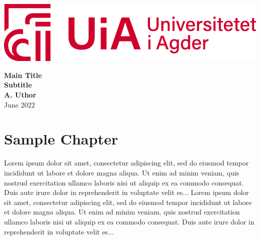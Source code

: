 \documentclass[12pt]{report}
\begin{document}
	\begin{titlepage}
		\centering    
		\vfill
		\includegraphics[width=0.5\paperwidth]{logo.png} %
		\vfill
		\vfill
		
		{\bfseries\Large
			Main Title\\
			Subtitle\\
			\vskip4cm
			A. Uthor\\
		}
		June 2022 \\
		\vfill
	\end{titlepage}
	\newpage
		\tableofcontents
	\newpage
		\listoffigures
	\newpage
	
	\chapter{Sample Chapter}
		\thispagestyle{empty}
	
		Lorem ipsum dolor sit amet, consectetur\autocite{Morales2020} adipiscing elit, sed do 
		eiusmod tempor incididunt ut labore et dolore magna aliqua. Ut enim 
		ad minim veniam, quis nostrud exercitation ullamco laboris nisi 
		ut aliquip ex ea commodo consequat. Duis aute irure dolor in 
		reprehenderit in voluptate velit es...
	\newpage
		Lorem ipsum dolor sit amet, consectetur\autocite{Morales2020} adipiscing elit, sed do 
		eiusmod tempor incididunt ut labore et dolore magna aliqua. Ut enim 
		ad minim veniam, quis nostrud exercitation ullamco laboris nisi 
		ut aliquip ex ea commodo consequat. Duis aute irure dolor in 
		reprehenderit in voluptate velit es...
	\newpage
		\printbibliography
\end{document}
